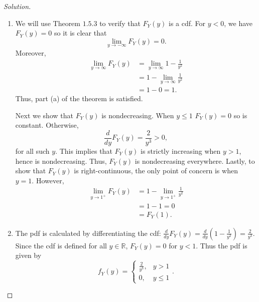 \documentclass[12pt]{article}
\theoremstyle{definition}
\theoremstyle{plain}
\newenvironment{solution}
  {\begin{proof}[Solution]}
  {\end{proof}}
\newcommand{\deriv}[1]{\frac{d}{d #1}}
\begin{document}
\begin{enumerate}
\begin{solution}
\begin{enumerate}
\item We will use Theorem $ 1.5.3 $ to verify that $ F_Y(y) $ is a cdf. For $ y < 0 $, we have $ F_Y(y) = 0 $ so it is clear that 
\[ \lim_{y \to -\infty} F_Y(y) = 0. \]
Moreover, 
\begin{align*}
	\lim_{y \to \infty} F_Y(y) &= \lim_{y \to \infty} 1 - \frac{1}{y^2}\\
	&= 1 - \lim_{y \to \infty} \frac{1}{y^2}\\
	&= 1 - 0 = 1.
\end{align*}
Thus, part (a) of the theorem is satisfied. 

Next we show that $ F_Y(y) $ is nondecreasing. When $ y \leq 1 $ $ F_Y(y) = 0$ so is constant. Otherwise, 
\[ \deriv{y} F_Y(y) = \frac{2}{y^3} > 0, \]
for all such $ y $. This implies that $ F_Y(y) $ is strictly increasing when $ y > 1 $, hence is nondecreasing. Thus, $ F_Y(y) $ is nondecreasing everywhere. Lastly, to show that $ F_Y(y) $ is right-continuous, the only point of concern is when $ y = 1 $. However,
\begin{align*}
	\lim_{y \to 1^+} F_Y(y) &= 1 - \lim_{y \to 1^+}\frac{1}{y^2}\\
	&= 1 - 1 = 0\\
	&= F_Y(1).
\end{align*}

\item The pdf is calculated by differentiating the cdf: $\deriv{y} F_Y(y) = \deriv{y} (1 - \frac{1}{y^2}) = \frac{2}{y^3}$. Since the cdf is defined for all $ y \in \mathbb{R} $, $ F_Y(y) = 0 $ for $ y < 1 $. Thus the pdf is given by 
\[ f_Y(y) = 
\begin{cases}
	\frac{2}{y^3}, &y > 1\\
	0, & y \leq 1
\end{cases}. \] 


\end{enumerate}
\end{solution}
\end{enumerate}
\end{document}
